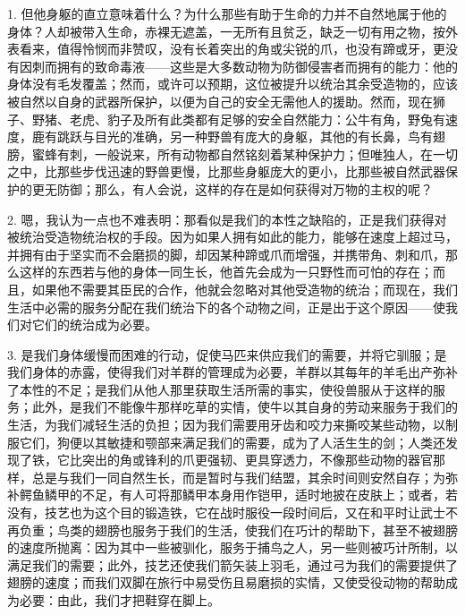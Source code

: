 1. 但他身躯的直立意味着什么？为什么那些有助于生命的力并不自然地属于他的身体？人却被带入生命，赤裸无遮盖，一无所有且贫乏，缺乏一切有用之物，按外表看来，值得怜悯而非赞叹，没有长着突出的角或尖锐的爪，也没有蹄或牙，更没有因刺而拥有的致命毒液——这些是大多数动物为防御侵害者而拥有的能力：他的身体没有毛发覆盖；然而，或许可以预期，这位被提升以统治其余受造物的，应该被自然以自身的武器所保护，以便为自己的安全无需他人的援助。然而，现在狮子、野猪、老虎、豹子及所有此类都有足够的安全自然能力：公牛有角，野兔有速度，鹿有跳跃与目光的准确，另一种野兽有庞大的身躯，其他的有长鼻，鸟有翅膀，蜜蜂有刺，一般说来，所有动物都自然铭刻着某种保护力；但唯独人，在一切之中，比那些步伐迅速的野兽更慢，比那些身躯庞大的更小，比那些被自然武器保护的更无防御；那么，有人会说，这样的存在是如何获得对万物的主权的呢？\par

2. 嗯，我认为一点也不难表明：那看似是我们的本性之缺陷的，正是我们获得对被统治受造物统治权的手段。因为如果人拥有如此的能力，能够在速度上超过马，并拥有由于坚实而不会磨损的脚，却因某种蹄或爪而增强，并携带角、刺和爪，那么这样的东西若与他的身体一同生长，他首先会成为一只野性而可怕的存在；而且，如果他不需要其臣民的合作，他就会忽略对其他受造物的统治；而现在，我们生活中必需的服务分配在我们统治下的各个动物之间，正是出于这个原因——使我们对它们的统治成为必要。\par

3. 是我们身体缓慢而困难的行动，促使马匹来供应我们的需要，并将它驯服；是我们身体的赤露，使得我们对羊群的管理成为必要，羊群以其每年的羊毛出产弥补了本性的不足；是我们从他人那里获取生活所需的事实，使役兽服从于这样的服务；此外，是我们不能像牛那样吃草的实情，使牛以其自身的劳动来服务于我们的生活，为我们减轻生活的负担；因为我们需要用牙齿和咬力来撕咬某些动物，以制服它们，狗便以其敏捷和颚部来满足我们的需要，成为了人活生生的剑；人类还发现了铁，它比突出的角或锋利的爪更强韧、更具穿透力，不像那些动物的器官那样，总是与我们一同自然生长，而是暂时与我们结盟，其余时间则安然自存；为弥补鳄鱼鳞甲的不足，有人可将那鳞甲本身用作铠甲，适时地披在皮肤上；或者，若没有，技艺也为这个目的锻造铁，它在战时服役一段时间后，又在和平时让武士不再负重；鸟类的翅膀也服务于我们的生活，使我们在巧计的帮助下，甚至不被翅膀的速度所抛离：因为其中一些被驯化，服务于捕鸟之人，另一些则被巧计所制，以满足我们的需要；此外，技艺还使我们箭矢装上羽毛，通过弓为我们的需要提供了翅膀的速度；而我们双脚在旅行中易受伤且易磨损的实情，又使受役动物的帮助成为必要：由此，我们才把鞋穿在脚上。\par


